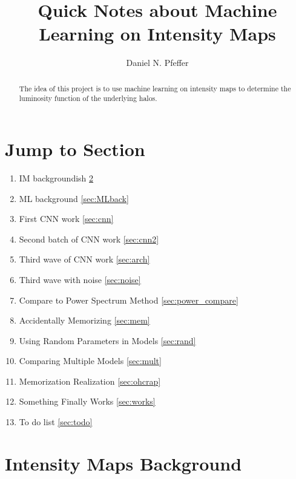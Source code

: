 \documentclass{article}
\title{Quick Notes about Machine Learning on Intensity Maps}
\author{Daniel N. Pfeffer}
\date{}
\begin{document}
% 

	\maketitle

	\begin{abstract}
		The idea of this project is to use machine learning on intensity maps to determine the luminosity function of the underlying halos.
	\end{abstract}

	\section{Jump to Section}
		\begin{enumerate}
			\item IM backgroundish \ref{sec:IMback}

			\item ML background \ref{sec:MLback}

			\item First CNN work \ref{sec:cnn}

			\item Second batch of CNN work \ref{sec:cnn2}

			\item Third wave of CNN work \ref{sec:arch}

			\item Third wave with noise \ref{sec:noise}

			\item Compare to Power Spectrum Method \ref{sec:power_compare}

			\item Accidentally Memorizing \ref{sec:mem}

			\item Using Random Parameters in Models \ref{sec:rand}

			\item Comparing Multiple Models \ref{sec:mult}

			\item Memorization Realization \ref{sec:ohcrap}

			\item Something Finally Works \ref{sec:works}

			\item To do list \ref{sec:todo}
		\end{enumerate}	

	\section{Intensity Maps Background} \label{sec:IMback}
\end{document}
